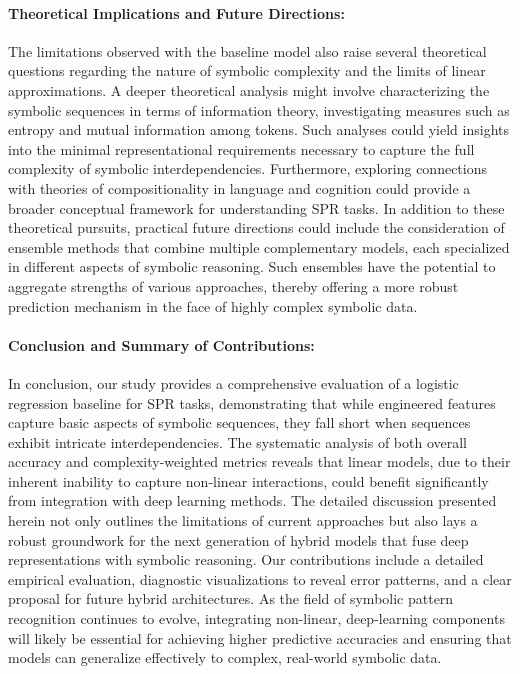 \documentclass{article}
\begin{document}
\paragraph{Theoretical Implications and Future Directions:} The limitations observed with the baseline model also raise several theoretical questions regarding the nature of symbolic complexity and the limits of linear approximations. A deeper theoretical analysis might involve characterizing the symbolic sequences in terms of information theory, investigating measures such as entropy and mutual information among tokens. Such analyses could yield insights into the minimal representational requirements necessary to capture the full complexity of symbolic interdependencies. Furthermore, exploring connections with theories of compositionality in language and cognition could provide a broader conceptual framework for understanding SPR tasks. In addition to these theoretical pursuits, practical future directions could include the consideration of ensemble methods that combine multiple complementary models, each specialized in different aspects of symbolic reasoning. Such ensembles have the potential to aggregate strengths of various approaches, thereby offering a more robust prediction mechanism in the face of highly complex symbolic data.

\paragraph{Conclusion and Summary of Contributions:} In conclusion, our study provides a comprehensive evaluation of a logistic regression baseline for SPR tasks, demonstrating that while engineered features capture basic aspects of symbolic sequences, they fall short when sequences exhibit intricate interdependencies. The systematic analysis of both overall accuracy and complexity-weighted metrics reveals that linear models, due to their inherent inability to capture non-linear interactions, could benefit significantly from integration with deep learning methods. The detailed discussion presented herein not only outlines the limitations of current approaches but also lays a robust groundwork for the next generation of hybrid models that fuse deep representations with symbolic reasoning. Our contributions include a detailed empirical evaluation, diagnostic visualizations to reveal error patterns, and a clear proposal for future hybrid architectures. As the field of symbolic pattern recognition continues to evolve, integrating non-linear, deep-learning components will likely be essential for achieving higher predictive accuracies and ensuring that models can generalize effectively to complex, real-world symbolic data.
\end{document}
